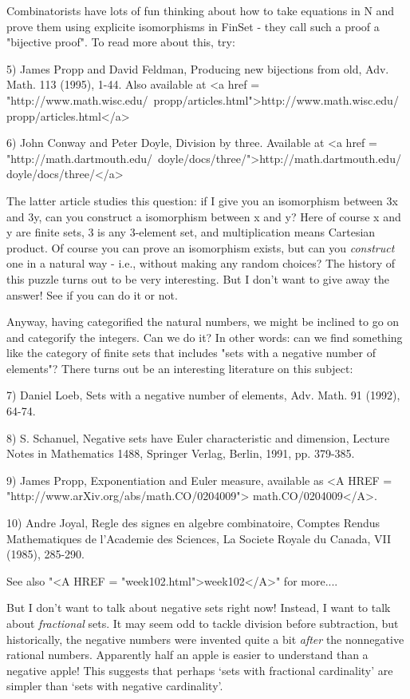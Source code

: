 Combinatorists have lots of fun thinking about how to take equations 
in N and prove them using explicite isomorphisms in FinSet - they call
such a proof a "bijective proof".  To read more about this, try:

5) James Propp and David Feldman, Producing new bijections from old,
Adv. Math. 113 (1995), 1-44.  Also available at 
<a href = "http://www.math.wisc.edu/~propp/articles.html">http://www.math.wisc.edu/~propp/articles.html</a>

6) John Conway and Peter Doyle, Division by three.  Available at
<a href = "http://math.dartmouth.edu/~doyle/docs/three/">http://math.dartmouth.edu/~doyle/docs/three/</a>

The latter article studies this question: if I give you an isomorphism 
between 3x and 3y, can you construct a isomorphism between x and y?  
Here of course x and y are finite sets, 3 is any 3-element set, and 
multiplication means Cartesian product.  Of course you can prove
an isomorphism exists, but can you \emph{construct} one in a natural way 
- i.e., without making any random choices?   The history of this 
puzzle turns out to be very interesting.  But I don't want to give 
away the answer!   See if you can do it or not.

Anyway, having categorified the natural numbers, we might be inclined
to go on and categorify the integers.  Can we do it?  In other words:
can we find something like the category of finite sets that includes
"sets with a negative number of elements"?  There turns out be an 
interesting literature on this subject:

7) Daniel Loeb, Sets with a negative number of elements, Adv. Math. 91 
(1992), 64-74.   

8) S. Schanuel, Negative sets have Euler characteristic and dimension, 
Lecture Notes in Mathematics 1488, Springer Verlag, Berlin, 1991, 
pp. 379-385.

9) James Propp, Exponentiation and Euler measure, available as 
<A HREF = "http://www.arXiv.org/abs/math.CO/0204009">
math.CO/0204009</A>.

10) Andre Joyal, Regle des signes en algebre combinatoire, Comptes 
Rendus Mathematiques de l'Academie des Sciences, La Societe Royale 
du Canada, VII (1985), 285-290.

See also "<A HREF = "week102.html">week102</A>" for more....

But I don't want to talk about negative sets right now!   Instead, 
I want to talk about \emph{fractional} sets.  It may seem odd to tackle
division before subtraction, but historically, the negative numbers 
were invented quite a bit \emph{after} the nonnegative rational numbers.
Apparently half an apple is easier to understand than a negative apple!  
This suggests that perhaps `sets with fractional cardinality' are 
simpler than `sets with negative cardinality'.  

